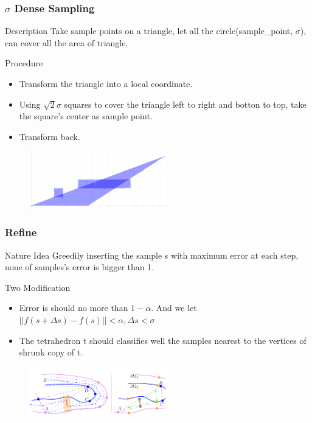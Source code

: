 \documentclass{beamer}
\begin{document}
\begin{frame}
\frametitle{$\sigma$ Dense Sampling}
\begin{block}{Description}
Take sample points on a triangle, let all the circle(sample\_point, $\sigma$), can cover all the area of triangle.
\end{block}
\begin{block}{Procedure}
\begin{itemize}
  \item Transform the triangle into a local coordinate.
  \item Using $\sqrt{2} \sigma$ squares to cover the triangle left to right and botton to top, take the square's center as sample point.
  \item Transform back.
\end{itemize}
\end{block}
\begin{figure}[h]
  \includegraphics[width=6cm]{sampling}
\end{figure}
\end{frame}


\begin{frame}
\frametitle{Refine}
\begin{block}{Nature Idea}
  Greedily inserting the sample s with maximum error at each step, none of samples's error is bigger than 1.
\end{block}
\begin{block}{Two Modification}
   \begin{itemize}
     \item Error is should no more than $1-\alpha$. And we let $||f(s+\Delta s)-f(s)||<\alpha, \Delta s < \sigma$
     \item The tetrahedron t should classifies well the samples nearest to the vertices of shrunk copy of t.
   \end{itemize}
\end{block}
\begin{figure}[h]
  \includegraphics[width=6cm]{shrunk}
\end{figure}
\end{frame}
\end{document}

